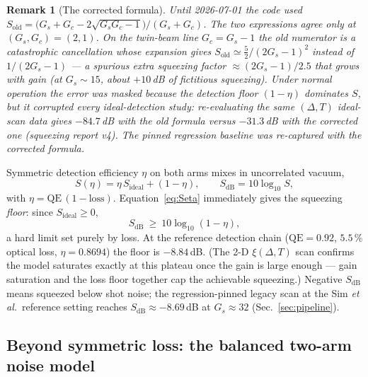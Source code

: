 \documentclass[11pt]{article}
\newtheorem{remark}{Remark}
\begin{document}
\begin{remark}[The corrected formula]
Until 2026-07-01 the code used
$S_{\text{old}}=\big(G_s+G_c-2\sqrt{G_sG_c-1}\big)/(G_s+G_c)$. The two
expressions agree only at $(G_s,G_c)=(2,1)$. On the twin-beam line $G_c=G_s-1$
the old numerator is a catastrophic cancellation whose expansion gives
$S_{\text{old}}\simeq\tfrac{5}{2}/(2G_s-1)^2$ instead of $1/(2G_s-1)$ --- a
spurious extra squeezing factor $\approx(2G_s-1)/2.5$ that grows with gain
(at $G_s\!\sim\!15$, about $+10\,$dB of fictitious squeezing). Under normal
operation the error was masked because the detection floor $(1-\eta)$ dominates
$S$, but it corrupted every ideal-detection study: re-evaluating the same
$(\Delta,T)$ ideal-scan data gives $-84.7$\,dB with the old formula versus
$-31.3$\,dB with the corrected one (squeezing report v4). The pinned regression
baseline was re-captured with the corrected formula.
\end{remark}

Symmetric detection efficiency $\eta$ on both arms mixes in uncorrelated vacuum,
\begin{equation}
S(\eta)=\eta\,S_{\text{ideal}}+(1-\eta),
\qquad
S_{\text{dB}}=10\log_{10}S,
\label{eq:Seta}
\end{equation}
with $\eta=\text{QE}\,(1-\text{loss})$. Equation~\eqref{eq:Seta} immediately gives
the squeezing \emph{floor}: since $S_{\text{ideal}}\!\ge\!0$,
\begin{equation}
S_{\text{dB}}\ \ge\ 10\log_{10}(1-\eta),
\label{eq:floor}
\end{equation}
a hard limit set purely by loss. At the reference detection chain
($\text{QE}=0.92$, $5.5\,\%$ optical loss, $\eta=0.8694$) the floor is
$-8.84\,$dB. (The 2-D $\xi(\Delta,T)$ scan confirms the model saturates exactly
at this plateau once the gain is large enough --- gain saturation and the loss
floor together cap the achievable squeezing.) Negative $S_{\text{dB}}$ means
squeezed below shot noise; the regression-pinned legacy scan at the Sim
\emph{et al.}\ reference setting reaches $S_{\text{dB}}\approx-8.69\,$dB at
$G_s\approx32$ (Sec.~\ref{sec:pipeline}).

\subsection{Beyond symmetric loss: the balanced two-arm noise model}
\label{sec:balanced}
\end{document}
